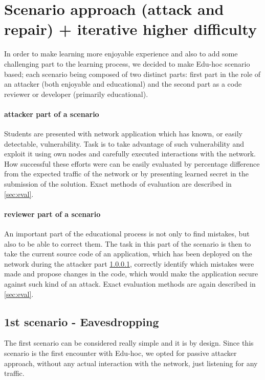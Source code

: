 \documentclass[
  digital, %
  table,   %
  nolof,     %
  nolot,     %
           oneside
]{fithesis3}
\begin{document}
  \section{Scenario approach (attack and repair) + iterative higher difficulty}
  In order to make learning more enjoyable experience and also to add some challenging part to the learning process, we decided to make Edu-hoc scenario based; each scenario being composed of two distinct parts: first part in the role of an attacker (both enjoyable and educational) and the second part as a code reviewer or developer (primarily educational).

  \paragraph{attacker part of a scenario}\label{par:att}
    Students are presented with network application which has known, or easily detectable, vulnerability. Task is to take advantage of such vulnerability and exploit it using own nodes and carefully executed interactions with the network. How successful these efforts were can be easily evaluated by percentage difference from the expected traffic of the network or by presenting learned secret in the submission of the solution. Exact methods of evaluation are described in \ref{sec:eval}.

  \paragraph{reviewer part of a scenario}
    An important part of the educational process is not only to find mistakes, but also to be able to correct them. The task in this part of the scenario is then to take the current source code of an application, which has been deployed on the network during the attacker part \ref{par:att}, correctly identify which mistakes were made and propose changes in the code, which would make the application secure against such kind of an attack. Exact evaluation methods are again described in \ref{sec:eval}.


    \subsection{1st scenario - Eavesdropping}\label{subsec:1st}
    The first scenario can be considered really simple and it is by design. Since this scenario is the first encounter with Edu-hoc, we opted for passive attacker approach, without any actual interaction with the network, just listening for any traffic.
\end{document}
